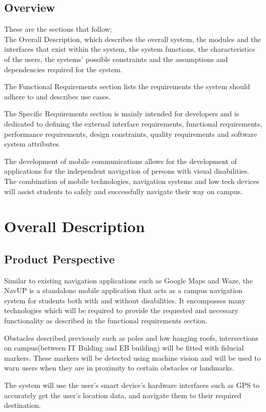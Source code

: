 \documentclass{article}
\begin{document}
	\subsection{Overview}
		These are the sections that follow; \\
		The Overall Description, which describes the overall system, the modules and the interfaces that exist within the system, the system functions, the characteristics of the users, the systems' possible constraints and the assumptions and dependencies required for the system.\par
		The Functional Requirements section lists the requirements the system should adhere to and describes use cases.\par
		The Specific Requirements section is mainly intended for developers and is dedicated to defining the external interface requirements, functional requirements, performance requirements, design constraints, quality requirements and software system attributes. \par
		The development of mobile communications allows for the development of applications for the independent navigation of persons with visual disabilities. The combination of mobile technologies, navigation systems and low tech devices will assist students to safely and successfully navigate their way on campus.	
		 

\newpage
\section{Overall Description}

	\subsection{Product Perspective}
		Similar to existing navigation applications such as Google Maps and Waze, the NavUP is a standalone mobile application that acts as a campus navigation system for students both with and without disabilities. It encompasses many technologies which will be required to provide the requested and necessary functionality as described in the functional requirements section.\\ \par
		Obstacles described previously such as poles and low hanging roofs, intersections on campus(between IT Bulding and EB building) will be fitted with fiducial markers. These markers will be detected using machine vision and will be used to warn users when they are in proximity to certain obstacles or landmarks.\par
		The system will use the user's smart device's hardware interfaces such as GPS to accurately get the user's location data, and navigate them to their required destination.\\
		
\end{document}
